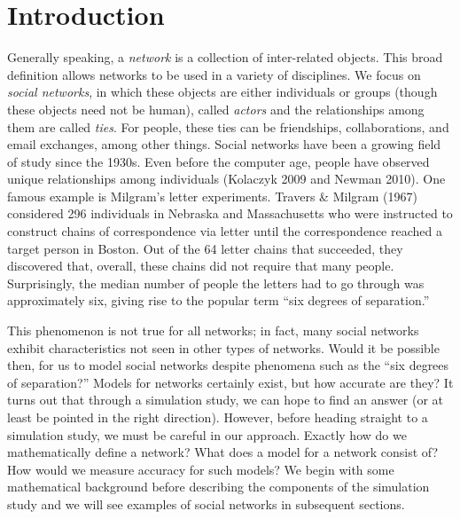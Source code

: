 \documentclass[12pt,twoside]{amherstthesis}
\begin{document}
  
  \mainmatter %
  \pagestyle{fancyplain} %

  \onehalfspacing
  
  \chapter*{Introduction}\label{introduction}
  
  Generally speaking, a \emph{network} is a collection of inter-related
  objects. This broad definition allows networks to be used in a variety
  of disciplines. We focus on \emph{social networks}, in which these
  objects are either individuals or groups (though these objects need not
  be human), called \emph{actors} and the relationships among them are
  called \emph{ties}. For people, these ties can be friendships,
  collaborations, and email exchanges, among other things. Social networks
  have been a growing field of study since the 1930s. Even before the
  computer age, people have observed unique relationships among
  individuals (Kolaczyk 2009 and Newman 2010). One famous example is
  Milgram's letter experiments. Travers \& Milgram (1967) considered 296
  individuals in Nebraska and Massachusetts who were instructed to
  construct chains of correspondence via letter until the correspondence
  reached a target person in Boston. Out of the 64 letter chains that
  succeeded, they discovered that, overall, these chains did not require
  that many people. Surprisingly, the median number of people the letters
  had to go through was approximately six, giving rise to the popular term
  ``six degrees of separation.''
  
  This phenomenon is not true for all networks; in fact, many social
  networks exhibit characteristics not seen in other types of networks.
  Would it be possible then, for us to model social networks despite
  phenomena such as the ``six degrees of separation?'' Models for networks
  certainly exist, but how accurate are they? It turns out that through a
  simulation study, we can hope to find an answer (or at least be pointed
  in the right direction). However, before heading straight to a
  simulation study, we must be careful in our approach. Exactly how do we
  mathematically define a network? What does a model for a network consist
  of? How would we measure accuracy for such models? We begin with some
  mathematical background before describing the components of the
  simulation study and we will see examples of social networks in
  subsequent sections.
  
\end{document}
